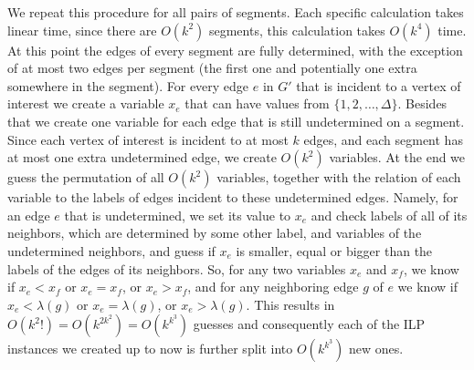 \documentclass[11pt,a4paper]{article}
\theoremstyle{remark}
\theoremstyle{definition}
\begin{document}
We repeat this procedure for all pairs of segments.
Each specific calculation takes linear time, since there are $O(k^2)$ segments, this calculation takes $O(k^4)$ time.
At this point
the edges of every segment are fully determined, 
with the exception of at most two edges per segment (the first one and potentially one extra somewhere in the segment).
For every edge $e$ in $G'$ that is incident to a vertex of interest we create a variable $x_e$ that can have values from $ \{1, 2, \dots, \Delta\}$.
Besides that we create one variable for each edge that is still undetermined on a segment.
Since each vertex of interest is incident to at most $k$ edges, and each segment has at most one extra undetermined edge, we create $O(k^2)$ variables.
At the end we guess the permutation of all $O(k^2)$ variables,
together with the relation of each variable to the labels of edges incident to these undetermined edges.
Namely, for an edge $e$ that is undetermined, we set its value to $x_e$ and check labels of all of its neighbors,
which are determined by some other label,
and variables of the undetermined neighbors,
and guess if $x_e$ is smaller, equal or bigger than the labels of the edges of its neighbors.
So, for any two variables $x_e$ and $x_f$, we know if $x_e < x_f$ or $x_e = x_f$, or $x_e > x_f$,
and for any neighboring edge $g$ of $e$ we know if $x_e < \lambda(g)$ or 
$x_e = \lambda(g)$, or $x_e > \lambda(g)$.
This results in $O(k^2 !) = O(k^{2k^2}) = O(k^{k^3})$ guesses
and consequently
each of the ILP instances we created up to now is further split into $O(k^{k^3})$ new ones.
\end{document}
